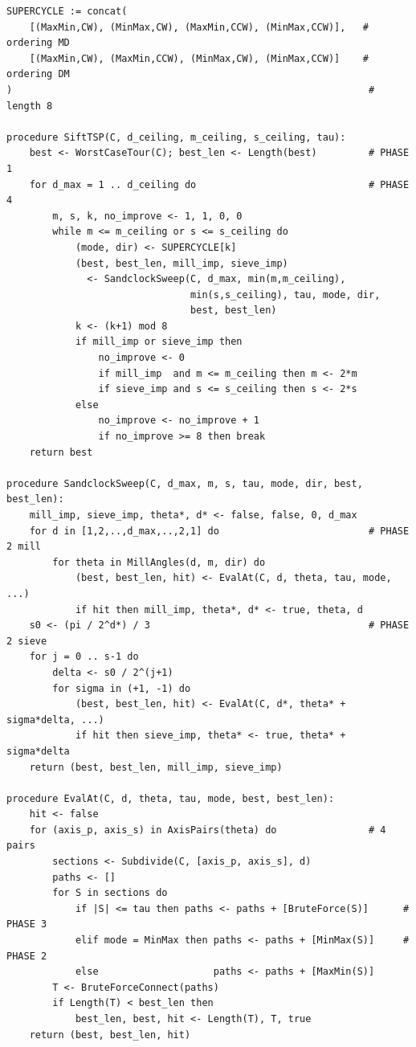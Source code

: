 \documentclass[11pt,a4paper]{article}
\begin{document}
\begin{small}
\begin{verbatim}
SUPERCYCLE := concat(
    [(MaxMin,CW), (MinMax,CW), (MaxMin,CCW), (MinMax,CCW)],   # ordering MD
    [(MaxMin,CW), (MaxMin,CCW), (MinMax,CW), (MinMax,CCW)]    # ordering DM
)                                                              # length 8

procedure SiftTSP(C, d_ceiling, m_ceiling, s_ceiling, tau):
    best <- WorstCaseTour(C); best_len <- Length(best)         # PHASE 1
    for d_max = 1 .. d_ceiling do                              # PHASE 4
        m, s, k, no_improve <- 1, 1, 0, 0
        while m <= m_ceiling or s <= s_ceiling do
            (mode, dir) <- SUPERCYCLE[k]
            (best, best_len, mill_imp, sieve_imp)
              <- SandclockSweep(C, d_max, min(m,m_ceiling),
                                min(s,s_ceiling), tau, mode, dir,
                                best, best_len)
            k <- (k+1) mod 8
            if mill_imp or sieve_imp then
                no_improve <- 0
                if mill_imp  and m <= m_ceiling then m <- 2*m
                if sieve_imp and s <= s_ceiling then s <- 2*s
            else
                no_improve <- no_improve + 1
                if no_improve >= 8 then break
    return best

procedure SandclockSweep(C, d_max, m, s, tau, mode, dir, best, best_len):
    mill_imp, sieve_imp, theta*, d* <- false, false, 0, d_max
    for d in [1,2,..,d_max,..,2,1] do                          # PHASE 2 mill
        for theta in MillAngles(d, m, dir) do
            (best, best_len, hit) <- EvalAt(C, d, theta, tau, mode, ...)
            if hit then mill_imp, theta*, d* <- true, theta, d
    s0 <- (pi / 2^d*) / 3                                      # PHASE 2 sieve
    for j = 0 .. s-1 do
        delta <- s0 / 2^(j+1)
        for sigma in (+1, -1) do
            (best, best_len, hit) <- EvalAt(C, d*, theta* + sigma*delta, ...)
            if hit then sieve_imp, theta* <- true, theta* + sigma*delta
    return (best, best_len, mill_imp, sieve_imp)

procedure EvalAt(C, d, theta, tau, mode, best, best_len):
    hit <- false
    for (axis_p, axis_s) in AxisPairs(theta) do                # 4 pairs
        sections <- Subdivide(C, [axis_p, axis_s], d)
        paths <- []
        for S in sections do
            if |S| <= tau then paths <- paths + [BruteForce(S)]      # PHASE 3
            elif mode = MinMax then paths <- paths + [MinMax(S)]     # PHASE 2
            else                    paths <- paths + [MaxMin(S)]
        T <- BruteForceConnect(paths)
        if Length(T) < best_len then
            best_len, best, hit <- Length(T), T, true
    return (best, best_len, hit)
\end{verbatim}
\end{small}
\end{document}
